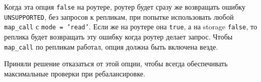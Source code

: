 Когда эта опция \texttt{false} на роутере, роутер будет сразу же возвращать
ошибку \texttt{UNSUPPORTED}, без запросов к репликам, при попытке использовать
любой \texttt{map\_call} с \texttt{mode = 'read'}. Если же на роутере она
\texttt{true}, а на storage \texttt{false}, то реплика будет возвращать эту
ошибку когда роутер делает запрос. Чтобы \texttt{map\_call} по репликам работал,
опция должна быть включена везде.

Приняли решение отказаться от этой опции, чтобы всегда обеспечивать
максимальные проверки при ребалансировке.
